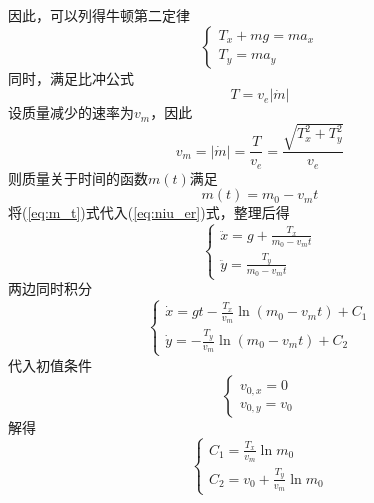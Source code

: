 \documentclass[withoutpreface,bwprint]{cumcmthesis} %
\begin{document}
    因此，可以列得牛顿第二定律
    \begin{equation}
        \begin{cases}
            T_x + mg = m a_x \\
            T_y = m a_y
            \label{eq:niu_er}
        \end{cases}
    \end{equation}
    同时，满足比冲公式
    \begin{equation*}
        T = v_e |\dot{m}|
    \end{equation*}
    设质量减少的速率为$v_m$，因此
    \begin{equation}
        \boxed{
            v_m = |\dot{m}| = \frac{T}{v_e} = \frac{\sqrt{T_x^2 + T_y^2}}{v_e}
        }
    \end{equation}
    则质量关于时间的函数$m(t)$满足
    \begin{equation}
        m(t) = m_0 - v_m t
        \label{eq:m_t}
    \end{equation}
    将(\ref{eq:m_t})式代入(\ref{eq:niu_er})式，整理后得
    \begin{equation}
        \begin{cases}
            \ddot{x} = g + \frac{T_x}{m_0 - v_m t} \\
            \ddot{y} = \frac{T_y}{m_0 - v_m t}
        \end{cases}
    \end{equation}
    两边同时积分
    \begin{equation*}
        \begin{cases}
            \dot{x} = gt - \frac{T_x}{v_m}\ln(m_0 - v_m t) + C_1 \\
            \dot{y} = -\frac{T_y}{v_m}\ln(m_0 - v_m t) + C_2
        \end{cases}
    \end{equation*}
    代入初值条件
    \begin{equation*}
        \begin{cases}
            v_{0,x} = 0 \\
            v_{0,y} = v_0
        \end{cases}
    \end{equation*}
    解得
    \begin{equation*}
        \begin{cases}
            C_1 = \frac{T_x}{v_m}\ln m_0\\
            C_2 = v_0 + \frac{T_y}{v_m}\ln m_0
        \end{cases}
    \end{equation*}
\end{document}
